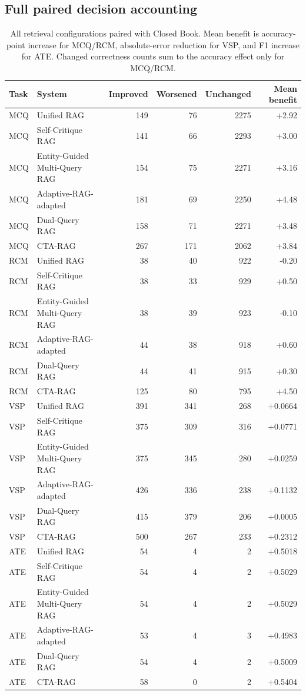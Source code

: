 \begin{table}[t]
\end{table}

\subsection{Full paired decision accounting}\label{app:utility}

\begin{table}[t]
\centering
\small
\caption{All retrieval configurations paired with Closed Book. Mean benefit is accuracy-point increase for MCQ/RCM, absolute-error reduction for VSP, and F1 increase for ATE. Changed correctness counts sum to the accuracy effect only for MCQ/RCM.}
\label{tab:all-utility}
\setlength{\tabcolsep}{5pt}
\begin{tabular}{@{}llrrrr@{}}
\toprule
Task & System & Improved & Worsened & Unchanged & Mean benefit \\
\midrule
MCQ & Unified RAG & 149 & 76 & 2275 & +2.92 \\
MCQ & Self-Critique RAG & 141 & 66 & 2293 & +3.00 \\
MCQ & Entity-Guided Multi-Query RAG & 154 & 75 & 2271 & +3.16 \\
MCQ & Adaptive-RAG-adapted & 181 & 69 & 2250 & +4.48 \\
MCQ & Dual-Query RAG & 158 & 71 & 2271 & +3.48 \\
MCQ & CTA-RAG & 267 & 171 & 2062 & +3.84 \\
RCM & Unified RAG & 38 & 40 & 922 & -0.20 \\
RCM & Self-Critique RAG & 38 & 33 & 929 & +0.50 \\
RCM & Entity-Guided Multi-Query RAG & 38 & 39 & 923 & -0.10 \\
RCM & Adaptive-RAG-adapted & 44 & 38 & 918 & +0.60 \\
RCM & Dual-Query RAG & 44 & 41 & 915 & +0.30 \\
RCM & CTA-RAG & 125 & 80 & 795 & +4.50 \\
VSP & Unified RAG & 391 & 341 & 268 & +0.0664 \\
VSP & Self-Critique RAG & 375 & 309 & 316 & +0.0771 \\
VSP & Entity-Guided Multi-Query RAG & 375 & 345 & 280 & +0.0259 \\
VSP & Adaptive-RAG-adapted & 426 & 336 & 238 & +0.1132 \\
VSP & Dual-Query RAG & 415 & 379 & 206 & +0.0005 \\
VSP & CTA-RAG & 500 & 267 & 233 & +0.2312 \\
ATE & Unified RAG & 54 & 4 & 2 & +0.5018 \\
ATE & Self-Critique RAG & 54 & 4 & 2 & +0.5029 \\
ATE & Entity-Guided Multi-Query RAG & 54 & 4 & 2 & +0.5029 \\
ATE & Adaptive-RAG-adapted & 53 & 4 & 3 & +0.4983 \\
ATE & Dual-Query RAG & 54 & 4 & 2 & +0.5009 \\
ATE & CTA-RAG & 58 & 0 & 2 & +0.5404 \\
\bottomrule
\end{tabular}

\end{table}

